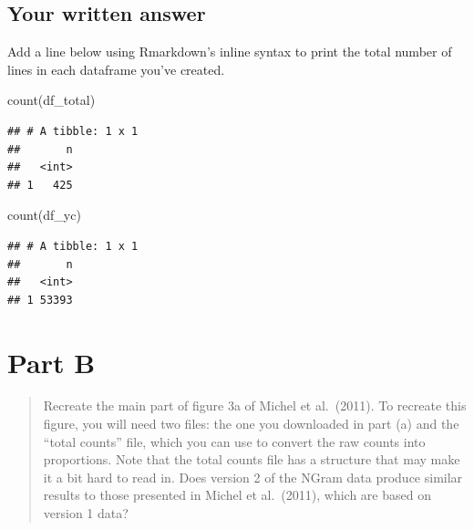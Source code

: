 \documentclass[
]{article}
\newenvironment{Shaded}{\begin{snugshade}}{\end{snugshade}}
\newcommand{\FunctionTok}[1]{\textcolor[rgb]{0.00,0.00,0.00}{#1}}
\newcommand{\NormalTok}[1]{#1}
\newcommand{\OtherTok}[1]{\textcolor[rgb]{0.56,0.35,0.01}{#1}}
\newcommand{\SpecialCharTok}[1]{\textcolor[rgb]{0.00,0.00,0.00}{#1}}
\newcommand{\StringTok}[1]{\textcolor[rgb]{0.31,0.60,0.02}{#1}}
\begin{document}
\begin{Shaded}
\end{Shaded}

\hypertarget{your-written-answer}{%
\subsection{Your written answer}\label{your-written-answer}}

Add a line below using Rmarkdown's inline syntax to print the total
number of lines in each dataframe you've created.

\begin{Shaded}
\begin{Highlighting}[]
\FunctionTok{count}\NormalTok{(df\_total)}
\end{Highlighting}
\end{Shaded}

\begin{verbatim}
## # A tibble: 1 x 1
##       n
##   <int>
## 1   425
\end{verbatim}

\begin{Shaded}
\begin{Highlighting}[]
\FunctionTok{count}\NormalTok{(df\_yc)}
\end{Highlighting}
\end{Shaded}

\begin{verbatim}
## # A tibble: 1 x 1
##       n
##   <int>
## 1 53393
\end{verbatim}

\hypertarget{part-b}{%
\section{Part B}\label{part-b}}

\begin{quote}
Recreate the main part of figure 3a of Michel et al.~(2011). To recreate
this figure, you will need two files: the one you downloaded in part (a)
and the ``total counts'' file, which you can use to convert the raw
counts into proportions. Note that the total counts file has a structure
that may make it a bit hard to read in. Does version 2 of the NGram data
produce similar results to those presented in Michel et al.~(2011),
which are based on version 1 data?
\end{quote}
\end{document}
